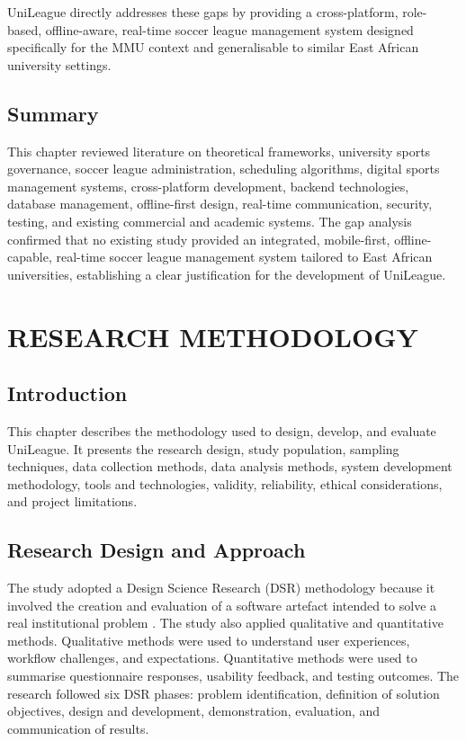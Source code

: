 \documentclass[12pt,a4paper]{report}
\begin{document}
UniLeague directly addresses these gaps by providing a cross-platform, role-based,
offline-aware, real-time soccer league management system designed specifically for the MMU
context and generalisable to similar East African university settings.

\section{Summary}
This chapter reviewed literature on theoretical frameworks, university sports governance,
soccer league administration, scheduling algorithms, digital sports management systems,
cross-platform development, backend technologies, database management, offline-first design,
real-time communication, security, testing, and existing commercial and academic systems.
The gap analysis confirmed that no existing study provided an integrated, mobile-first,
offline-capable, real-time soccer league management system tailored to East African
universities, establishing a clear justification for the development of UniLeague.

\chapter{RESEARCH METHODOLOGY}
\section{Introduction}
This chapter describes the methodology used to design, develop, and evaluate UniLeague. It
presents the research design, study population, sampling techniques, data collection methods,
data analysis methods, system development methodology, tools and technologies, validity,
reliability, ethical considerations, and project limitations.

\section{Research Design and Approach}
The study adopted a Design Science Research (DSR) methodology because it involved the creation
and evaluation of a software artefact intended to solve a real institutional problem
\cite{hevner2004}. The study also applied qualitative and quantitative methods. Qualitative
methods were used to understand user experiences, workflow challenges, and expectations.
Quantitative methods were used to summarise questionnaire responses, usability feedback,
and testing outcomes. The research followed six DSR phases: problem identification, definition
of solution objectives, design and development, demonstration, evaluation, and communication
of results.
\end{document}
